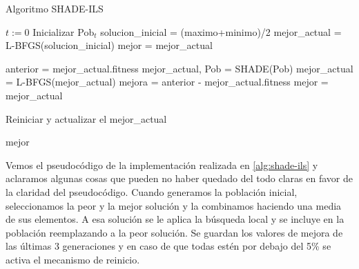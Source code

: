 \begin{algorithm}
\caption{Algoritmo SHADE-ILS}
\label{alg:shade-ils}
	\begin{algorithmic}
		\State $t:=0$
		\State Inicializar Pob$_t$
		\State solucion\_inicial = (maximo+minimo)/2
		\State mejor\_actual = L-BFGS(solucion\_inicial)
		\State mejor = mejor\_actual
		
			\State anterior = mejor\_actual.fitness
			\State mejor\_actual, Pob = SHADE(Pob)
			\State mejor\_actual = L-BFGS(mejor\_actual)
			\State mejora = anterior - mejor\_actual.fitness
				\State mejor = mejor\_actual
			\EndIf
			
				\State Reiniciar y actualizar el mejor\_actual
			\EndIf		
		\EndWhile
		
		\Return mejor
	\end{algorithmic}
\end{algorithm}

Vemos el pseudocódigo de la implementación realizada en \ref{alg:shade-ils} y aclaramos algunas cosas que pueden no haber quedado del todo claras en favor de la claridad del pseudocódigo. Cuando generamos la población inicial, seleccionamos la peor y la mejor solución y la combinamos haciendo una media de sus elementos. A esa solución se le aplica la búsqueda local y se incluye en la población reemplazando a la peor solución. Se guardan los valores de mejora de las últimas 3 generaciones y en caso de que todas estén por debajo del 5\% se activa el mecanismo de reinicio.





